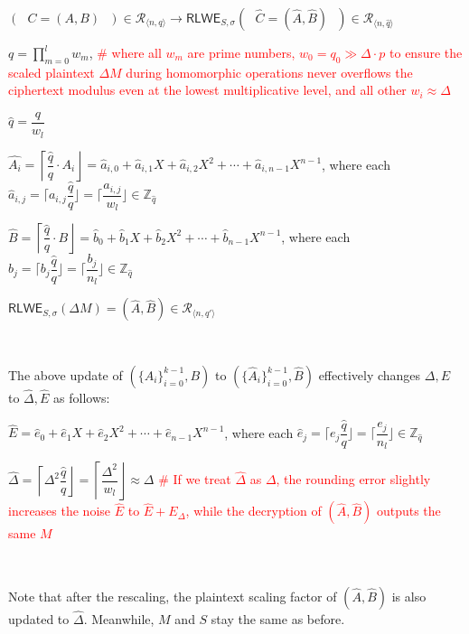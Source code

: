 $(\text{ }C = (A, B)\text{ }) \in \mathcal{R}_{\langle n, q \rangle} \rightarrow \textsf{RLWE}_{S, \sigma}(\text{ }\hat{C} = (\hat{A}, \hat{B})\text{ }) \in \mathcal{R}_{\langle n, \hat q \rangle}$ 


$q = \prod\limits_{m=0}^{l}w_m$, \textcolor{red}{ \text{ } \# where all $w_m$ are prime numbers,  $w_0 = q_0 \gg \Delta\cdot p$ to ensure the scaled plaintext $\Delta M$ during homomorphic operations never overflows the ciphertext modulus even at the lowest multiplicative level, and all other $w_i \approx \Delta$}

$\hat{q} = \dfrac{q}{w_l}$

$\hat{A_i} = \left\lceil\dfrac{\hat q}{q}\cdot A_i\right\rfloor = \hat{a}_{i,0} + \hat{a}_{i,1}X + \hat{a}_{i,2}X^2 + \cdots + \hat{a}_{i, {n-1}}X^{n-1}$, where each $\hat{a}_{i,j} = \Big\lceil a_{i,j}\dfrac{\hat{q}}{q} \Big\rfloor = \Big\lceil \dfrac{a_{i,j}}{w_l} \Big\rfloor \in \mathbb{Z}_{\hat{q}}$ 


$\hat{B} = \left\lceil\dfrac{\hat q}{q}\cdot B\right\rfloor = \hat{b}_0 + \hat{b}_1X + \hat{b}_2X^2 + \cdots + \hat{b}_{n-1}X^{n-1}$, where each $\hat{b}_j = \Big\lceil b_j\dfrac{\hat{q}}{q} \Big\rfloor = \Big\lceil \dfrac{b_j}{n_l} \Big\rfloor \in \mathbb{Z}_{\hat{q}}$


$\textsf{RLWE}_{{S},\sigma}(\Delta  M) = (\hat{A}, \hat{B}) \in \mathcal{R}_{\langle n, q' \rangle}$ 


$ $

The above update of $(\{A_i\}_{i=0}^{k-1}, B)$ to $(\{\hat{A}_i\}_{i=0}^{k-1}, \hat B)$ effectively changes $\Delta, E$ to $\hat\Delta, \hat E$ as follows:

$\hat{E} = \hat{e}_0 + \hat{e}_1X + \hat{e}_2X^2 + \cdots + \hat{e}_{n-1}X^{n-1}$, where each $\hat{e}_j = \Big\lceil e_j\dfrac{\hat{q}}{q} \Big\rfloor = \Big\lceil \dfrac{e_j}{n_l} \Big\rfloor \in \mathbb{Z}_{\hat{q}}$

$\hat{\Delta} = \left\lceil\Delta^2\dfrac{\hat{q}}{q}\right\rfloor = \left\lceil\dfrac{\Delta^2}{w_l}\right\rfloor \approx \Delta$ \textcolor{red}{ \# If we treat $\hat\Delta$ as $\Delta$, the rounding error slightly increases the noise $\hat E$ to $\hat E + E_\Delta$, while the decryption of $(\hat A, \hat B)$ outputs the same $M$}

$ $

Note that after the rescaling, the plaintext scaling factor of $(\hat A, \hat B)$ is also updated to $\hat \Delta$. Meanwhile, $M$ and $S$ stay the same as before.

$ $

